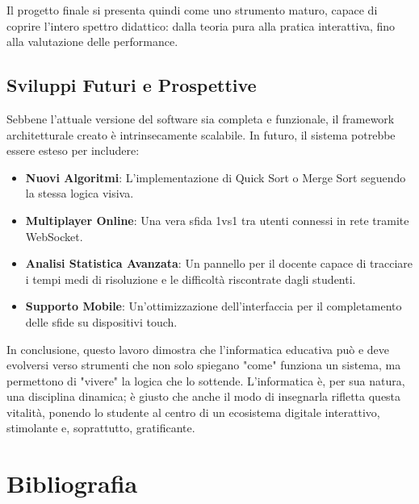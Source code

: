 \documentclass[openany]{theme/uniprthesis}
\begin{document}
Il progetto finale si presenta quindi come uno strumento maturo, capace di coprire l'intero spettro didattico: dalla teoria pura alla pratica interattiva, fino alla valutazione delle performance.

\section*{Sviluppi Futuri e Prospettive}
Sebbene l'attuale versione del software sia completa e funzionale, il framework architetturale creato è intrinsecamente scalabile. In futuro, il sistema potrebbe essere esteso per includere:
\begin{itemize}
    \item \textbf{Nuovi Algoritmi}: L'implementazione di Quick Sort o Merge Sort seguendo la stessa logica visiva.
    \item \textbf{Multiplayer Online}: Una vera sfida 1vs1 tra utenti connessi in rete tramite WebSocket.
    \item \textbf{Analisi Statistica Avanzata}: Un pannello per il docente capace di tracciare i tempi medi di risoluzione e le difficoltà riscontrate dagli studenti.
    \item \textbf{Supporto Mobile}: Un'ottimizzazione dell'interfaccia per il completamento delle sfide su dispositivi touch.
\end{itemize}

In conclusione, questo lavoro dimostra che l'informatica educativa può e deve evolversi verso strumenti che non solo spiegano "come" funziona un sistema, ma permettono di "vivere" la logica che lo sottende. L'informatica è, per sua natura, una disciplina dinamica; è giusto che anche il modo di insegnarla rifletta questa vitalità, ponendo lo studente al centro di un ecosistema digitale interattivo, stimolante e, soprattutto, gratificante.

\chapter*{Bibliografia}
\end{document}
